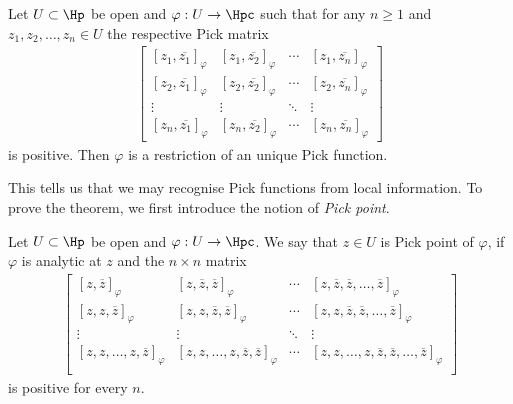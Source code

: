 \begin{lause}\label{open_pick_nevanlinna}
	Let $U \subset \Hp$ be open and $\varphi : U \to \Hpc$ such that for any $n \geq 1$ and $z_{1}, z_{2}, \ldots, z_{n} \in U$ the respective Pick matrix
	\begin{align*}
	\begin{bmatrix}
		[z_{1}, \overline{z_{1}}]_{\varphi} & [z_{1}, \overline{z_{2}}]_{\varphi} & \cdots & [z_{1}, \overline{z_{n}}]_{\varphi} \\
		[z_{2}, \overline{z_{1}}]_{\varphi} & [z_{2}, \overline{z_{2}}]_{\varphi} & \cdots & [z_{2}, \overline{z_{n}}]_{\varphi} \\
		\vdots & \vdots & \ddots & \vdots \\
		[z_{n}, \overline{z_{1}}]_{\varphi} & [z_{n}, \overline{z_{2}}]_{\varphi} & \cdots &  [z_{n}, \overline{z_{n}}]_{\varphi}
	\end{bmatrix}
	\end{align*}
	is positive. Then $\varphi$ is a restriction of an unique Pick function.
\end{lause}

This tells us that we may recognise Pick functions from local information. To prove the theorem, we first introduce the notion of \textit{Pick point}.

\begin{maar}
	Let $U \subset \Hp$ be open and $\varphi : U \to \Hpc$. We say that $z \in U$ is Pick point of $\varphi$, if $\varphi$ is analytic at $z$ and the $n \times n$ matrix
	\begin{align*}
	\begin{bmatrix}
		[z, \overline{z}]_{\varphi} & [z, \overline{z}, \overline{z} ]_{\varphi} & \cdots & [z, \overline{z}, \overline{z}, \ldots, \overline{z}]_{\varphi} \\
		[z, z, \overline{z}]_{\varphi} & [z, z, \overline{z}, \overline{z} ]_{\varphi} & \cdots & [z, z, \overline{z}, \overline{z}, \ldots, \overline{z}]_{\varphi} \\
		\vdots & \vdots & \ddots & \vdots \\
		[z, z, \ldots, z, \overline{z}]_{\varphi} & [z, z, \ldots, z, \overline{z}, \overline{z} ]_{\varphi} & \cdots & [z, z, \ldots, z, \overline{z}, \overline{z}, \ldots, \overline{z}]_{\varphi} \\
	\end{bmatrix}
	\end{align*}
	is positive for every $n$.
\end{maar}

